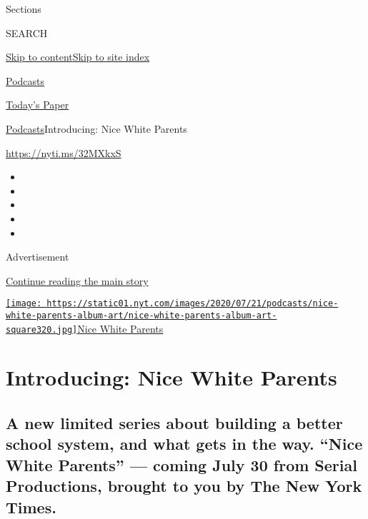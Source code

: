 Sections

SEARCH

\protect\hyperlink{site-content}{Skip to
content}\protect\hyperlink{site-index}{Skip to site index}

\href{https://www.nytimes.com/spotlight/podcasts}{Podcasts}

\href{https://myaccount.nytimes.com/auth/login?response_type=cookie\&client_id=vi}{}

\href{https://www.nytimes.com/section/todayspaper}{Today's Paper}

\href{/spotlight/podcasts}{Podcasts}\textbar{}Introducing: Nice White
Parents

\url{https://nyti.ms/32MXkxS}

\begin{itemize}
\item
\item
\item
\item
\item
\end{itemize}

Advertisement

\protect\hyperlink{after-top}{Continue reading the main story}

\href{https://www.nytimes.com/column/nice-white-parents}{\texttt{[image: https://static01.nyt.com/images/2020/07/21/podcasts/nice-white-parents-album-art/nice-white-parents-album-art-square320.jpg]}Nice
White Parents}

\hypertarget{introducing-nice-white-parents}{%
\section{Introducing: Nice White
Parents}\label{introducing-nice-white-parents}}

\hypertarget{a-new-limited-series-about-building-a-better-school-system-and-what-gets-in-the-way-nice-white-parents--coming-july-30-from-serial-productions-brought-to-you-by-the-new-york-times}{%
\subsection{A new limited series about building a better school system,
and what gets in the way. ``Nice White Parents'' --- coming July 30 from
Serial Productions, brought to you by The New York
Times.}\label{a-new-limited-series-about-building-a-better-school-system-and-what-gets-in-the-way-nice-white-parents--coming-july-30-from-serial-productions-brought-to-you-by-the-new-york-times}}

